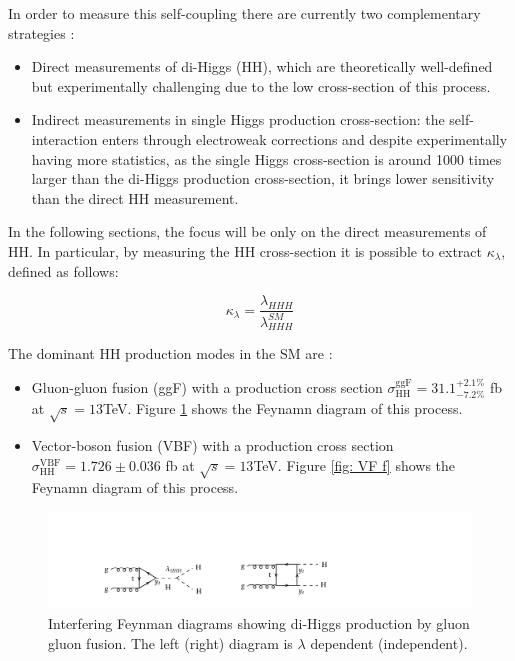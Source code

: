 In order to measure this self-coupling there are currently two complementary strategies \cite{talklucacometa}:
\begin{itemize}
    \item Direct measurements of di-Higgs (HH), which are theoretically well-defined but experimentally challenging due to the low cross-section of this process.
    \item Indirect measurements in single Higgs production cross-section: the self-interaction enters through electroweak corrections and despite experimentally having more statistics, as the single Higgs cross-section is around 1000 times larger than the di-Higgs production cross-section, it brings lower sensitivity than the direct HH measurement.
\end{itemize}

In the following sections, the focus will be only on the direct measurements of HH. In particular, by measuring the HH cross-section it is possible to extract $\kappa_\lambda$, defined as follows:

\begin{equation}
    \kappa_\lambda=\frac{\lambda_{HHH}}{\lambda^{SM}_{HHH}}
\end{equation}

\newpage

\noindent The dominant HH production modes in the SM are \cite{ANRun2}:
\begin{itemize}
    \item Gluon-gluon fusion (ggF) with a production cross section $\sigma^{\text{ggF}}_{\text{HH}}=31.1^{+2.1\%}_{-7.2\%}$ fb at $\sqrt{s}=13$TeV. Figure \ref{fig: GGF f} shows the Feynamn diagram of this process.
    \item Vector-boson fusion (VBF) with a production cross section $\sigma^{\text{VBF}}_{\text{HH}}= 1.726 \pm 0.036$ fb at $\sqrt{s}=13$TeV. Figure \ref{fig: VF f} shows the Feynamn diagram of this process.
\end{itemize}

\begin{figure}[hbt]
    \centering
    \includegraphics[width=1\linewidth]{Images/5.SPANet/gluon gluon fusion.pdf}
    \caption{Interfering Feynman diagrams showing di-Higgs production by gluon gluon fusion. The left (right) diagram is $\lambda$ dependent (independent).}
    \label{fig: GGF f}
\end{figure}

